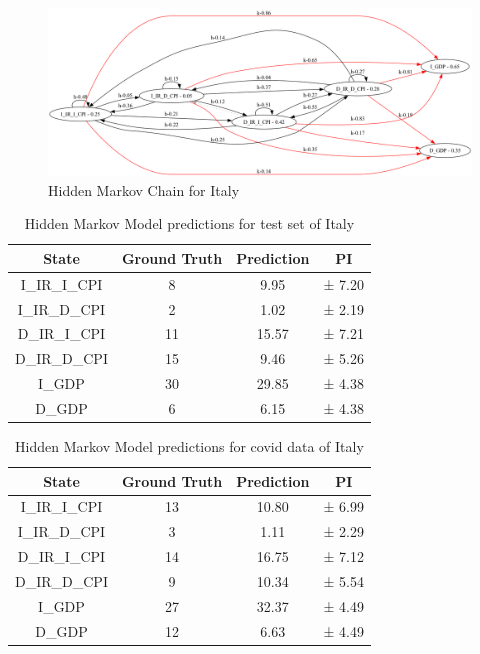 \begin{figure}[H]
    \centering
    \includegraphics[width=\columnwidth]{imgs/italy_hmm.png}
    \caption{Hidden Markov Chain for Italy}
    \label{fig:correlation_us}
\end{figure}

\begin{table}[H]
  \centering
  \begin{tabular}{|c|c|c|c|}
    \hline
    State         & Ground Truth & Prediction & PI     \\
    \hline
    I\_IR\_I\_CPI & 8            & 9.95       & ± 7.20 \\
    I\_IR\_D\_CPI & 2            & 1.02       & ± 2.19 \\
    D\_IR\_I\_CPI & 11           & 15.57      & ± 7.21 \\
    D\_IR\_D\_CPI & 15           & 9.46       & ± 5.26 \\
    I\_GDP        & 30           & 29.85      & ± 4.38 \\
    D\_GDP        & 6            & 6.15       & ± 4.38 \\
    \hline
  \end{tabular}
  \label{tab:italy_test}
  \caption{Hidden Markov Model predictions for test set of Italy}
\end{table}

\begin{table}[H]
  \centering
  \begin{tabular}{|c|c|c|c|}
    \hline
    State         & Ground Truth & Prediction & PI     \\
    \hline
    I\_IR\_I\_CPI & 13           & 10.80      & ± 6.99 \\
    I\_IR\_D\_CPI & 3            & 1.11       & ± 2.29 \\
    D\_IR\_I\_CPI & 14           & 16.75      & ± 7.12 \\
    D\_IR\_D\_CPI & 9            & 10.34      & ± 5.54 \\
    I\_GDP        & 27           & 32.37      & ± 4.49 \\
    D\_GDP        & 12           & 6.63       & ± 4.49 \\
    \hline
  \end{tabular}
  \label{tab:italy_covid}
  \caption{Hidden Markov Model predictions for covid data of Italy}
\end{table}

